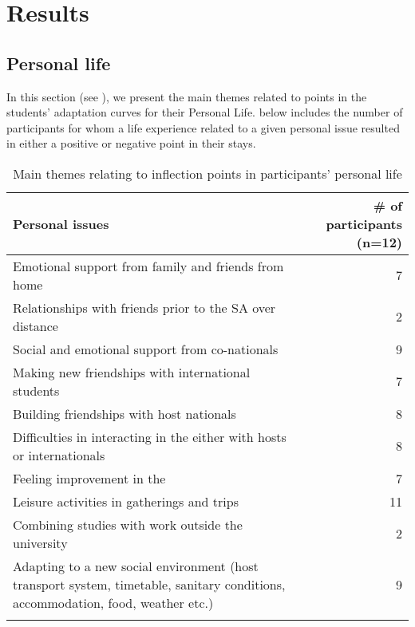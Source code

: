 \documentclass[output=paper]{langsci/langscibook}
\begin{document}
\section{Results}


\subsection{Personal life}


In this section (see ), we present the main themes related to  points in the students’ adaptation curves for their Personal Life.  below includes the number of participants for whom a life experience related to a given personal issue resulted in either a positive or negative  point in their stays.

\begin{table}[t]
\begin{tabularx}{\textwidth}{Qr}
\lsptoprule

 \bfseries Personal issues & \bfseries \# of participants (n=12)\\
 \midrule 
Emotional support from family and friends from home & 7\\
\tablevspace 
Relationships with friends prior to the SA over distance & 2\\
\tablevspace 
Social and emotional support from co-nationals & 9\\
\tablevspace 
Making new friendships with international students & 7\\
\tablevspace 
Building friendships with host nationals & 8\\
\tablevspace 
Difficulties in interacting in the  either with hosts or internationals & 8\\
\tablevspace 
Feeling improvement in the  & 7\\
\tablevspace 
Leisure activities in gatherings and trips & 11\\
\tablevspace 
Combining studies with work outside the university & 2\\
\tablevspace 
Adapting to a new social environment (host transport system, timetable, sanitary conditions, accommodation, food, weather etc.) & 9\\
\lspbottomrule
\end{tabularx} 
\caption{Main themes relating to inflection points in participants’ personal life}
\label{tab:pogorelova:2}
\end{table}
\end{document}
